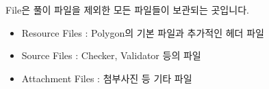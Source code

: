 \documentclass{article}
\begin{document}
    File은 풀이 파일을 제외한 모든 파일들이 보관되는 곳입니다.
    \begin{itemize}
        \item Resource Files : Polygon의 기본 파일과 추가적인 헤더 파일
        \item Source Files : Checker, Validator 등의 파일
        \item Attachment Files : 첨부사진 등 기타 파일
    \end{itemize}
\end{document}
